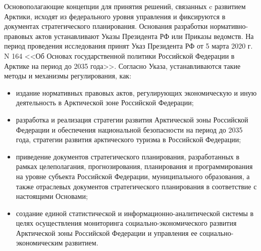 Основополагающие концепции для принятия решений, связанных c развитием Арктики, исходят из федерального уровня управления и фиксируются в документах стратегического планирования.
Основания разработки нормативно-правовых актов устанавливают Указы Президента РФ или Приказы ведомств.
На период проведения исследования принят Указ Президента РФ от 5 марта 2020 г. N 164 <<Об Основах государственной политики Российской Федерации в Арктике на период до 2035 года>>.
Согласно Указа, устанавливаются такие методы и механизмы регулирования, как:
\begin{itemize}
    \item издание нормативных правовых актов, регулирующих экономическую и иную деятельность в Арктической зоне Российской Федерации;
    \item разработка и реализация стратегии развития Арктической зоны Российской Федерации и обеспечения национальной безопасности на период до 2035 года, стратегии развития арктического туризма в Российской Федерации;
    \item приведение документов стратегического планирования, разработанных в рамках целеполагания, прогнозирования, планирования и программирования на уровне субъекта Российской Федерации, муниципального образования, а также отраслевых документов стратегического планирования в соответствие с настоящими Основами;
    \item создание единой статистической и информационно-аналитической системы в целях осуществления мониторинга социально-экономического развития Арктической зоны Российской Федерации и управления ее социально-экономическим развитием.
\end{itemize}

